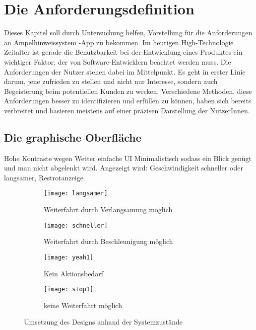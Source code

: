 \chapter{Die Anforderungsdefinition}
Dieses Kapitel soll durch Untersuchung helfen, Vorstellung für die Anforderungen an Ampelhinweissystem -App zu bekommen. 
Im heutigen High-Technologie Zeitalter ist gerade die Benutzbarkeit bei der Entwicklung eines Produktes ein wichtiger Faktor, der von Software-Entwicklern beachtet werden muss. Die Anforderungen der Nutzer stehen dabei im Mittelpunkt. Es geht in erster Linie darum, jene zufrieden zu stellen und nicht nur Interesse, sondern auch Begeisterung beim potentiellen Kunden zu wecken. Verschiedene Methoden, diese Anforderungen besser zu identifizieren und erfüllen zu können, haben sich bereits verbreitet und basieren meistens auf einer präzisen Darstellung der NutzerInnen.
\section{Die graphische Oberfläche}

Hohe Kontraste wegen Wetter
einfache UI 
Minimalistisch sodass ein Blick genügt und man nicht abgelenkt wird.
Angezeigt wird: Geschwindigkeit schneller oder langsamer, 
Restrotanzeige.
\begin{figure}[H]
        \centering
        \begin{subfigure}[t]{0.23\textwidth}
                \texttt{[image: langsamer]}
                \caption[Systemzustand a]{Weiterfahrt durch Verlangsamung möglich}
                \label{fig:langsamer}
        \end{subfigure}
        \hfill
        \begin{subfigure}[t]{0.23\textwidth}
                \texttt{[image: schneller]}
                \caption[Systemzustand b]{Weiterfahrt durch Beschleunigung möglich}
                \label{fig:schneller}
        \end{subfigure}
        \hfill
        \begin{subfigure}[t]{0.23\textwidth}
                \texttt{[image: yeah1]}
                \caption[Systemzustand c]{Kein Aktionsbedarf}
                \label{fig:langsamer}
        \end{subfigure}
        \hfill 
        \begin{subfigure}[t]{0.23\textwidth}
                \texttt{[image: stop1]}
                \caption[Systemzustand d]{keine Weiterfahrt möglich}
                \label{fig:schneller}
        \end{subfigure}
        \caption[Systemzustände im Ampelbereich]{Umsetzung des Designs anhand der Systemzustände}
        \label{fig:szenario_mockup}
\end{figure} 

